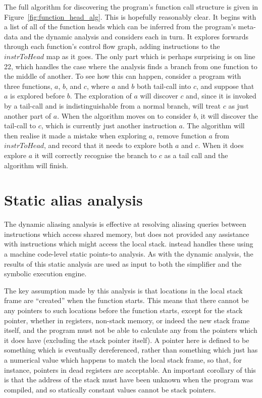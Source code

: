 The full algorithm for discovering the program's function call
structure is given in Figure~\ref{fig:function_head_alg}.  This is
hopefully reasonably clear.  It begins with a list of all of the
function heads which can be inferred from the program's meta-data and
the dynamic analysis and considers each in turn.  It explores forwards
through each function's control flow graph, adding instructions to the
$\mathit{instrToHead}$ map as it goes.  The only part which is perhaps
surprising is on line 22, which handles the case where the analysis
finds a branch from one function to the middle of another.  To see how
this can happen, consider a program with three functions, $a$, $b$,
and $c$, where $a$ and $b$ both tail-call into $c$, and suppose that
$a$ is explored before $b$.  The exploration of $a$ will discover $c$
and, since it is invoked by a tail-call and is indistinguishable from
a normal branch, will treat $c$ as just another part of $a$.  When the
algorithm moves on to consider $b$, it will discover the tail-call to
$c$, which is currently just another instruction $a$.  The algorithm
will then realise it made a mistake when exploring $a$, remove
function $a$ from $\mathit{instrToHead}$, and record that it needs to
explore both $a$ and $c$.  When it does explore $a$ it will correctly
recognise the branch to $c$ as a tail call and the algorithm will
finish.

\section{Static alias analysis}
\label{sect:program_model:static_aliasing}


The dynamic aliasing analysis is effective at resolving aliasing
queries between instructions which access shared memory, but does not
provided any assistance with instructions which might access the local
stack.  {\Technique} instead handles these using a machine code-level
static points-to analysis.  As with the dynamic analysis, the results
of this static analysis are used as input to both the {\StateMachine}
simplifier and the symbolic execution engine.

The key assumption made by this analysis is that locations in the
local stack frame are ``created'' when the function starts.  This
means that there cannot be any pointers to such locations before the
function starts, except for the stack pointer, whether in registers,
non-stack memory, or indeed the new stack frame itself, and the
program must not be able to calculate any from the pointers which it
does have (excluding the stack pointer itself).  A pointer here is
defined to be something which is eventually dereferenced, rather than
something which just has a numerical value which happens to match the
local stack frame, so that, for instance, pointers in dead registers
are acceptable.  An important corollary of this is that the address of
the stack must have been unknown when the program was compiled, and so
statically constant values cannot be stack pointers.


